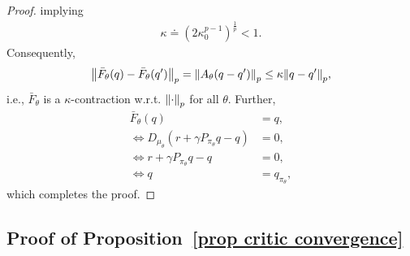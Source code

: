 \documentclass[twoside,11pt]{article}
\numberwithin{assucounter}{section}
\begin{document}
\begin{proof}
  implying
  \begin{align}
    \kappa \doteq (2\kappa_0^{p-1})^{\frac{1}{p}} < 1.
  \end{align} 
  Consequently,
  \begin{align}
    \norm{\bar F_\theta(q) - \bar F_\theta(q')}_p = \norm{A_\theta (q - q')}_p \leq \kappa \norm{q - q'}_p,
  \end{align}
  i.e.,
  $\bar F_\theta$ is a $\kappa$-contraction w.r.t. $\norm{\cdot}_p$ for all $\theta$.
  Further,
  \begin{align}
    \bar F_\theta(q) &= q, \\
    \iff D_{\mu_\theta}(r + \gamma P_{\pi_\theta} q - q) &= 0, \\
    \iff r + \gamma P_{\pi_\theta} q - q &=0, \\
    \iff q &= q_{\pi_\theta},
  \end{align}
  which completes the proof.
\end{proof}

\subsection{Proof of Proposition~\ref{prop critic convergence}}
\end{document}
